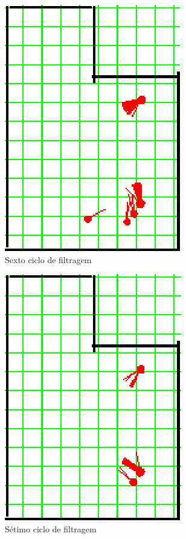 \begin{figure}[H]
  \centering
  \includegraphics[scale=1]{figuras/cen4_ex5/7.eps}
  \caption[Sexto Ciclo de Filtragem]{Sexto ciclo de filtragem}
  \label{img:cen4_ex5_7}
\end{figure}

\begin{figure}[H]
  \centering
  \includegraphics[scale=1]{figuras/cen4_ex5/8.eps}
  \caption[Sétimo Ciclo de Filtragem]{Sétimo ciclo de filtragem}
  \label{img:cen4_ex5_8}
\end{figure}

